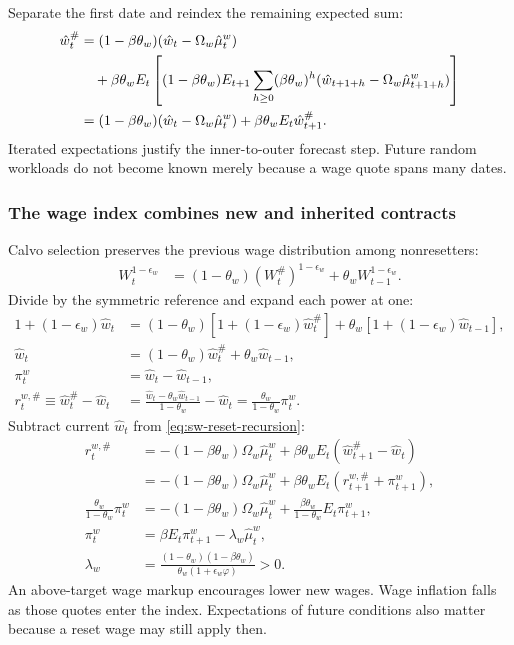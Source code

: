 Separate the first date and reindex the remaining expected sum:
\begin{align}
 \hat w_t^{\#}
 &=(1-\beta\theta_w)(\hat w_t-\Omega_w\hat\mu_t^w)\notag\\
 &\quad+\beta\theta_w E_t\left[(1-\beta\theta_w)E_{t+1}
        \sum_{h\geq0}(\beta\theta_w)^h
                  (\hat w_{t+1+h}-\Omega_w\hat\mu_{t+1+h}^w)\right]\\
 &=(1-\beta\theta_w)(\hat w_t-\Omega_w\hat\mu_t^w)
                          +\beta\theta_wE_t\hat w_{t+1}^{\#}.
 \label{eq:sw-reset-recursion}
\end{align}
Iterated expectations justify the inner-to-outer forecast step. Future random
workloads do not become known merely because a wage quote spans many dates.

\subsubsection{The wage index combines new and inherited contracts}

Calvo selection preserves the previous wage distribution among nonresetters:
\begin{align}
 W_t^{1-\epsilon_w}
 &=(1-\theta_w)(W_t^{\#})^{1-\epsilon_w}
                              +\theta_wW_{t-1}^{1-\epsilon_w}.
\end{align}
Divide by the symmetric reference and expand each power at one:
\begin{align}
 1+(1-\epsilon_w)\hat w_t
 &=(1-\theta_w)[1+(1-\epsilon_w)\hat w_t^{\#}]
               +\theta_w[1+(1-\epsilon_w)\hat w_{t-1}],\\
 \hat w_t&=(1-\theta_w)\hat w_t^{\#}+\theta_w\hat w_{t-1},\\
 \pi_t^w&=\hat w_t-\hat w_{t-1},\\
 r_t^{w,\#}\equiv\hat w_t^{\#}-\hat w_t
 &=\frac{\hat w_t-\theta_w\hat w_{t-1}}{1-\theta_w}-\hat w_t
 =\frac{\theta_w}{1-\theta_w}\pi_t^w.
\end{align}
Subtract current $\hat w_t$ from \eqref{eq:sw-reset-recursion}:
\begin{align}
 r_t^{w,\#}
 &=-(1-\beta\theta_w)\Omega_w\hat\mu_t^w
        +\beta\theta_w E_t(\hat w_{t+1}^{\#}-\hat w_t)\\
 &=-(1-\beta\theta_w)\Omega_w\hat\mu_t^w
        +\beta\theta_w E_t(r_{t+1}^{w,\#}+\pi_{t+1}^w),\\
 \frac{\theta_w}{1-\theta_w}\pi_t^w
 &=-(1-\beta\theta_w)\Omega_w\hat\mu_t^w
            +\frac{\beta\theta_w}{1-\theta_w}E_t\pi_{t+1}^w,\\
 \pi_t^w&=\beta E_t\pi_{t+1}^w-\lambda_w\hat\mu_t^w,\\
 \lambda_w&=\frac{(1-\theta_w)(1-\beta\theta_w)}
                   {\theta_w(1+\epsilon_w\varphi)}>0.
 \label{eq:sw-wage-pc}
\end{align}
An above-target wage markup encourages lower new wages. Wage inflation falls
as those quotes enter the index. Expectations of future conditions also matter
because a reset wage may still apply then.

